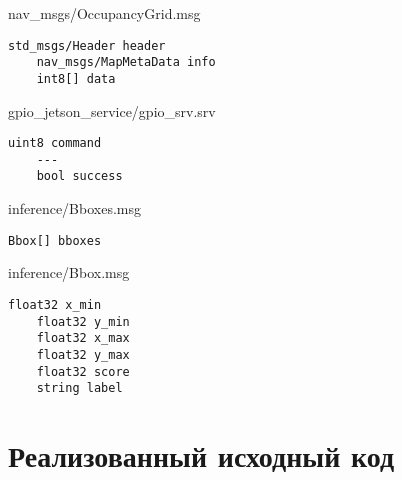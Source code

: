 \begin{ListingEnv}[!h]%
    \captiondelim{ } %
    \caption{nav\_msgs/OccupancyGrid.msg}\label{lst:occupancy-grid-msg}
    \begin{lstlisting}[language={[ISO]C++}]
	std_msgs/Header header
	nav_msgs/MapMetaData info
	int8[] data
    \end{lstlisting}
\end{ListingEnv}%

\begin{ListingEnv}[!h]%
    \captiondelim{ } %
    \caption{gpio\_jetson\_service/gpio\_srv.srv}\label{lst:gpio-srv}
    \begin{lstlisting}[language={[ISO]C++}]
	uint8 command
	---
	bool success
    \end{lstlisting}
\end{ListingEnv}%

\begin{ListingEnv}[!h]%
    \captiondelim{ } %
    \caption{inference/Bboxes.msg}\label{lst:bboxes-msg}
    \begin{lstlisting}[language={[ISO]C++}]
	Bbox[] bboxes
    \end{lstlisting}
\end{ListingEnv}%

\begin{ListingEnv}[!h]%
    \captiondelim{ } %
    \caption{inference/Bbox.msg}\label{lst:bbox-msg}
    \begin{lstlisting}[language={[ISO]C++}]
	float32 x_min
	float32 y_min
	float32 x_max
	float32 y_max
	float32 score
	string label
    \end{lstlisting}
\end{ListingEnv}%

\chapter{Реализованный исходный код}

\begingroup
\captiondelim{ } %
    
\endgroup